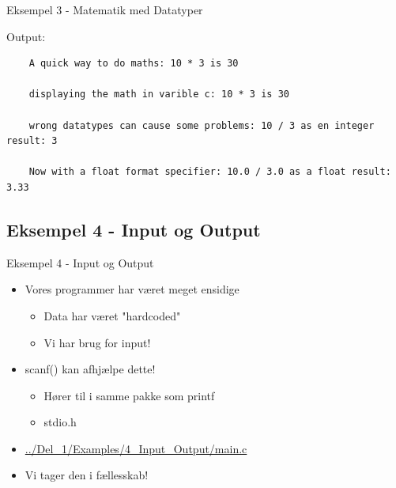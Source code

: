 \documentclass{beamer}
\begin{document}
\begin{frame}[fragile]{Eksempel 3 - Matematik med Datatyper}
	\begin{center}
	Output:
	\begin{lstlisting}
	A quick way to do maths: 10 * 3 is 30

	displaying the math in varible c: 10 * 3 is 30

	wrong datatypes can cause some problems: 10 / 3 as en integer result: 3

	Now with a float format specifier: 10.0 / 3.0 as a float result: 3.33

	\end{lstlisting}
	\end{center}
\end{frame}

\subsection{Eksempel 4 - Input og Output}
\begin{frame}{Eksempel 4 - Input og Output}
	\begin{itemize}
	\item{Vores programmer har været meget ensidige}
		\begin{itemize}
		\item{Data har været "hardcoded"}
		\item{Vi har brug for input!}
		\end{itemize}
	\item{scanf() kan afhjælpe dette!}
		\begin{itemize}
		\item{Hører til i samme pakke som printf}
		\item{stdio.h}
		\end{itemize}
	\item{\color{link}\href{https://github.com/Iakop/C-Programmering-for-begyndere/tree/master/Del_1/Examples/4_Input_Output/main.c}{../Del\_1/Examples/4\_Input\_Output/main.c}}
	\item{Vi tager den i fællesskab!}
	\end{itemize}
\end{frame}
\end{document}
